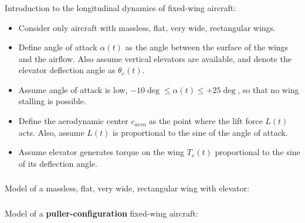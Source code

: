 \documentclass[ 10pt, xcolor = dvipsnames]{beamer}
\begin{document}
\begin{frame}[allowframebreaks]
\frametitle{\insertsection}

Introduction to the longitudinal dynamics of fixed-wing aircraft:
\begin{itemize}
\item Consider only aircraft with massless, flat, very wide, rectangular wings. 
\item Define angle of attack $\alpha(t)$ as the angle between the surface of the wings and the airflow. Also assume vertical elevators are available, and denote \linebreak the elevator deflection angle as $\theta_e(t)$. 
\item Assume angle of attack is low, \eg $-10\deg \leq \alpha(t) \leq +25\deg$, so that \linebreak no wing stalling is possible. 
\item Define the aerodynamic center $c_{aero}$ as the point where the lift force $L(t)$ acts. Also, assume $L(t)$ is proportional to the sine of the angle of attack. 
\item Assume elevator generates torque on the wing $T_e(t)$ proportional to the sine of its deflection angle. 
\end{itemize}

\end{frame}

\begin{frame}[allowframebreaks]
\frametitle{\insertsection}

Model of a massless, flat, very wide, rectangular wing with elevator:
\begin{figure}[htb]
\centering
\def\svgwidth{0.9\columnwidth}

\end{figure}

\end{frame}

\begin{frame}[allowframebreaks]
\frametitle{\insertsection}

\end{frame}

\begin{frame}[allowframebreaks]
\frametitle{\insertsection}

Model of a \textbf{puller-configuration} fixed-wing aircraft: 
\begin{figure}[htb]
\centering
\def\svgwidth{\columnwidth}

\end{figure}

\end{frame}
\end{document}
